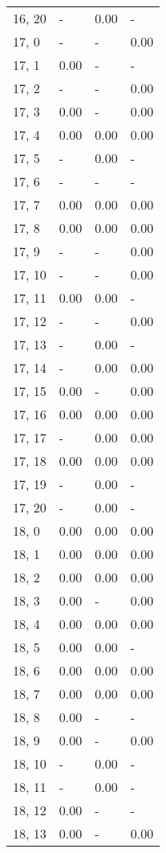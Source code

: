 \begin{table}
\begin{tabular}{llll}
16, 20 &     - &  0.00 &     - \\
17, 0  &     - &     - &  0.00 \\
17, 1  &  0.00 &     - &     - \\
17, 2  &     - &     - &  0.00 \\
17, 3  &  0.00 &     - &  0.00 \\
17, 4  &  0.00 &  0.00 &  0.00 \\
17, 5  &     - &  0.00 &     - \\
17, 6  &     - &     - &     - \\
17, 7  &  0.00 &  0.00 &  0.00 \\
17, 8  &  0.00 &  0.00 &  0.00 \\
17, 9  &     - &     - &  0.00 \\
17, 10 &     - &     - &  0.00 \\
17, 11 &  0.00 &  0.00 &     - \\
17, 12 &     - &     - &  0.00 \\
17, 13 &     - &  0.00 &     - \\
17, 14 &     - &  0.00 &  0.00 \\
17, 15 &  0.00 &     - &  0.00 \\
17, 16 &  0.00 &  0.00 &  0.00 \\
17, 17 &     - &  0.00 &  0.00 \\
17, 18 &  0.00 &  0.00 &  0.00 \\
17, 19 &     - &  0.00 &     - \\
17, 20 &     - &  0.00 &     - \\
18, 0  &  0.00 &  0.00 &  0.00 \\
18, 1  &  0.00 &  0.00 &  0.00 \\
18, 2  &  0.00 &  0.00 &  0.00 \\
18, 3  &  0.00 &     - &  0.00 \\
18, 4  &  0.00 &  0.00 &  0.00 \\
18, 5  &  0.00 &  0.00 &     - \\
18, 6  &  0.00 &  0.00 &  0.00 \\
18, 7  &  0.00 &  0.00 &  0.00 \\
18, 8  &  0.00 &     - &     - \\
18, 9  &  0.00 &     - &  0.00 \\
18, 10 &     - &  0.00 &     - \\
18, 11 &     - &  0.00 &     - \\
18, 12 &  0.00 &     - &     - \\
18, 13 &  0.00 &     - &  0.00 \\

\end{tabular}
\end{table}
